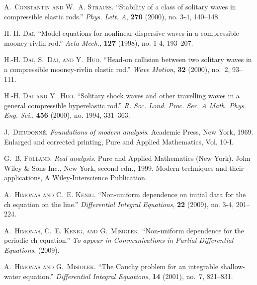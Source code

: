\documentclass[12pt,reqno]{amsart}
\theoremstyle{plain}  %
\theoremstyle{definition}
\begin{document}
\begin{thebibliography}{10}
\textsc{A.~Constantin and W.~A. Strauss}.
\newblock \enquote{Stability of a class of solitary waves in compressible
  elastic rods.}
\newblock \emph{Phys. Lett. A}, \textbf{270} (2000), no. 3-4, 140--148.

\textsc{H.-H. Dai}.
\newblock \enquote{Model equations for nonlinear dispersive waves in a
  compressible mooney-rivlin rod.}
\newblock \emph{Acta Mech.}, \textbf{127} (1998), no. 1-4, 193--207.

\textsc{H.-H. Dai, S.~Dai, and Y.~Huo}.
\newblock \enquote{Head-on collision between two solitary waves in a
  compressible mooney-rivlin elastic rod.}
\newblock \emph{Wave Motion}, \textbf{32} (2000), no.~2, 93--111.

\textsc{H.-H. Dai and Y.~Huo}.
\newblock \enquote{Solitary shock waves and other travelling waves in a general
  compressible hyperelastic rod.}
\newblock \emph{R. Soc. Lond. Proc. Ser. A Math. Phys. Eng. Sci.}, \textbf{456}
  (2000), no. 1994, 331--363.

\textsc{J.~Dieudonn{{\'e}}}.
\newblock \emph{Foundations of modern analysis}.
\newblock Academic Press, New York, 1969.
\newblock Enlarged and corrected printing, Pure and Applied Mathematics, Vol.
  10-I.

\textsc{G.~B. Folland}.
\newblock \emph{Real analysis}.
\newblock Pure and Applied Mathematics (New York). John Wiley \& Sons Inc., New
  York, second edn., 1999.
\newblock Modern techniques and their applications, A Wiley-Interscience
  Publication.

\textsc{A.~Himonas and C.~E. Kenig}.
\newblock \enquote{Non-uniform dependence on initial data for the ch equation
  on the line.}
\newblock \emph{Differential Integral Equations}, \textbf{22} (2009), no. 3-4,
  201--224.

\textsc{A.~Himonas, C.~E. Kenig, and G.~Misio{\l}ek}.
\newblock \enquote{Non-uniform dependence for the periodic ch equation.}
\newblock \emph{To appear in Communications in Partial Differential Equations},
   (2009).

\textsc{A.~Himonas and G.~Misio{\l}ek}.
\newblock \enquote{The {C}auchy problem for an integrable shallow-water
  equation.}
\newblock \emph{Differential Integral Equations}, \textbf{14} (2001), no.~7,
  821--831.


\end{thebibliography}
\end{document}
